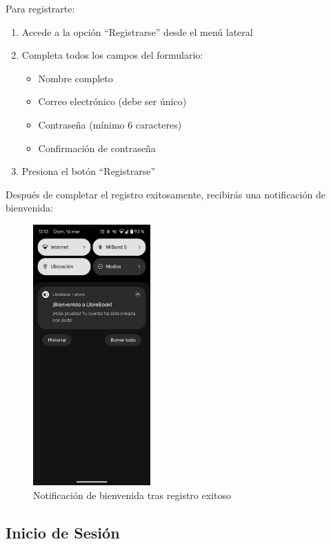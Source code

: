 \documentclass[a4paper,12pt]{report}
\begin{document}
      Para registrarte:
      \begin{enumerate}
        \item Accede a la opción ``Registrarse'' desde el menú lateral
        \item Completa todos los campos del formulario:
        \begin{itemize}
          \item Nombre completo
          \item Correo electrónico (debe ser único)
          \item Contraseña (mínimo 6 caracteres)
          \item Confirmación de contraseña
        \end{itemize}
        \item Presiona el botón ``Registrarse''
      \end{enumerate}
      
      Después de completar el registro exitosamente, recibirás una notificación de bienvenida:
      
      \begin{figure}[H]
        \centering
        \includegraphics[width=0.4\textwidth]{.img/registro-noti.png}
        \caption{Notificación de bienvenida tras registro exitoso}
        \label{fig:notificacion}
      \end{figure}
    
    \subsection{Inicio de Sesión}
    
\end{document}
